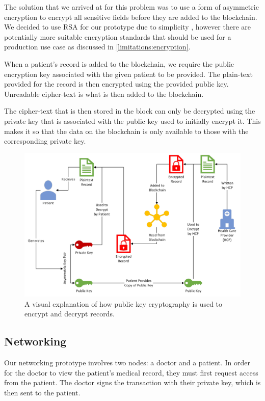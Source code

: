 \documentclass{article}
\begin{document}
The solution that we arrived at for this problem was to use a form of asymmetric encryption to encrypt all sensitive fields before they are added to the blockchain. We decided to use RSA for our prototype due to simplicity \cite{menezes_van_oorschot_vanstone_2001}, however there are potentially more suitable encryption standards that should be used for a production use case as discussed in \ref{limitations:encryption}.

When a patient's record is added to the blockchain, we require the public encryption key associated with the given patient to be provided. The plain-text provided for the record is then encrypted using the provided public key. Unreadable cipher-text is what is then added to the blockchain.

The cipher-text that is then stored in the block can only be decrypted using the private key that is associated with the public key used to initially encrypt it. This makes it so that the data on the blockchain is only available to those with the corresponding private key.

\begin{figure}[h]
\centering
\includegraphics[width=\textwidth]{images/4990_encryption_structure.png}
\caption{A visual explanation of how public key cryptography is used to encrypt and decrypt records.}
\label{fig:encryption_decryption}
\end{figure}

\subsection{Networking}
\label{networking}
Our networking prototype involves two nodes: a doctor and a patient. In order for the doctor to view the patient's medical record, they must first request access from the patient. The doctor signs the transaction with their private key, which is then sent to the patient.
\end{document}
